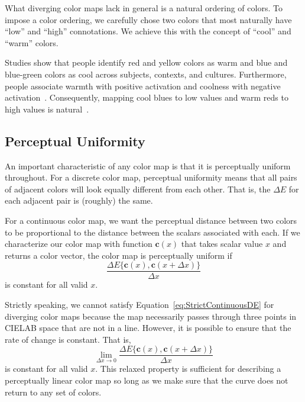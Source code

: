 \documentclass{llncs}
\newcommand{\Lab}{CIELAB\xspace}
\newcommand{\DeltaE}{\ensuremath{\Delta{}E}\xspace}
\newcommand*{\cvec}[1]{\mathbf{#1}}
\begin{document}
What diverging color maps lack in general is a natural ordering of colors.
To impose a color ordering, we carefully chose two colors that most
naturally have ``low'' and ``high'' connotations.  We achieve this with the
concept of ``cool'' and ``warm'' colors.

Studies show that people identify red and yellow colors as warm and blue and
blue-green colors as cool across subjects, contexts, and
cultures.  Furthermore, people associate warmth with positive activation
and coolness with negative activation~\cite{Hardin97}.  Consequently,
mapping cool blues to low values and warm reds to high values is
natural~\cite{Fortner97}.


\subsection{Perceptual Uniformity}
\label{sec:PerceptualUniformity}

An important characteristic of any color map is that it is perceptually
uniform throughout.  For a discrete color map, perceptual uniformity means
that all pairs of adjacent colors will look equally different from each
other.  That is, the \DeltaE for each adjacent pair is (roughly) the same.

For a continuous color map, we want the perceptual distance between two
colors to be proportional to the distance between the scalars associated
with each.    If we characterize our color map with function $\cvec{c}(x)$
that takes scalar value $x$ and returns a color vector, the color map is
perceptually uniform if
\begin{equation}
  \frac{\DeltaE\{\cvec{c}(x),\cvec{c}(x+\Delta{x})\}}{\Delta{}x}
  \label{eq:StrictContinuousDE}
\end{equation}
is constant for all valid $x$.

Strictly speaking, we cannot satisfy Equation~\ref{eq:StrictContinuousDE}
for diverging color maps because the map necessarily passes through three
points in \Lab space that are not in a line.  However, it is possible to
ensure that the rate of change is constant.  That is,
\begin{equation}
  \lim_{\Delta{}x \rightarrow 0}{
    \frac{\DeltaE\{\cvec{c}(x),\cvec{c}(x+\Delta{x})\}}{\Delta{}x} }
  \label{eq:ContinuousDE}
\end{equation}
is constant for all valid $x$.  This relaxed property is sufficient for
describing a perceptually linear color map so long as we make sure that the
curve does not return to any set of colors.
\end{document}
